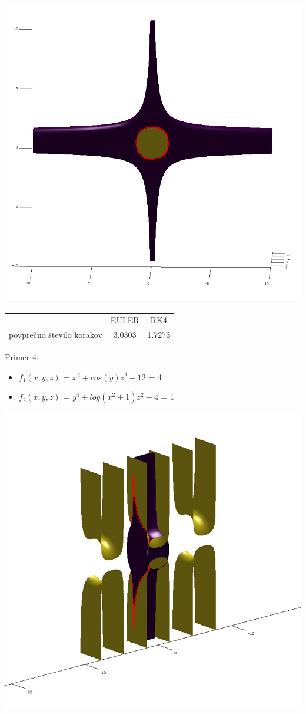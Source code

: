 \documentclass[]{article}
\begin{document}
	\includegraphics[scale=0.3]{primer3_2}
	\begin{center}
	\begin{tabular}{ |c|c|c| } 
 		\hline
 			 & EULER & RK4 \\ 
			povprečno število korakov & 3.0303 & 1.7273 \\ 
 		\hline
 	\end{tabular}
	\end{center}
	Primer 4:
	\begin{itemize}  
		\item $f_{1}(x,y,z)$ = $x^2 + cos(y)z^2 - 12$ = 4
		\item $f_{2}(x,y,z)$ = $y^4 + log(x^2 + 1)z^2 - 4$ = 1
	\end{itemize}
	\includegraphics[scale=0.3]{primer4_1}
\end{document}
